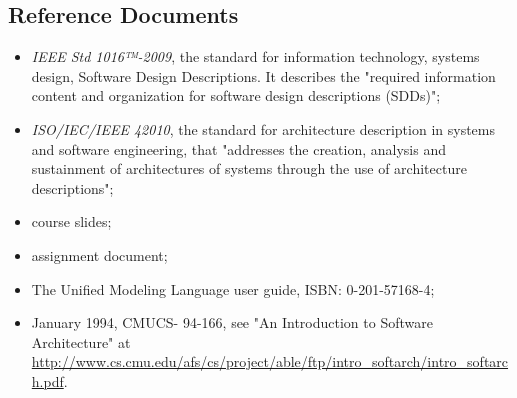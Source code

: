 \documentclass{article}
\begin{document}
\subsection{Reference Documents}
\begin{itemize}
    \item \textit{IEEE Std 1016™-2009}, the standard for information technology, systems design, Software Design Descriptions. It describes the "required information content and organization for software design descriptions (SDDs)";
    \item \textit{ISO/IEC/IEEE 42010}, the standard for architecture description in systems and software engineering, that "addresses the creation, analysis and sustainment of architectures of systems
through the use of architecture descriptions";
\item course slides;
\item assignment document;
\item The Unified Modeling Language user guide, ISBN: 0-201-57168-4;
\item January 1994, CMUCS-
94-166, see "An Introduction to Software Architecture"
at \url{http://www.cs.cmu.edu/afs/cs/project/able/ftp/intro_softarch/intro_softarch.pdf}.
\end{itemize}
\end{document}
